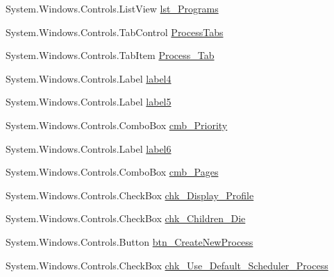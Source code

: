 \begin{DoxyCompactItemize}
\item 
System.\+Windows.\+Controls.\+List\+View \hyperlink{class_c_p_u___o_s___simulator_1_1_operating_system_main_window_a08c9b2131c204ca49f85c7dbc3c0bde2}{lst\+\_\+\+Programs}
\item 
System.\+Windows.\+Controls.\+Tab\+Control \hyperlink{class_c_p_u___o_s___simulator_1_1_operating_system_main_window_a6e2a1da42cb207d3a02c3bc1613be085}{Process\+Tabs}
\item 
System.\+Windows.\+Controls.\+Tab\+Item \hyperlink{class_c_p_u___o_s___simulator_1_1_operating_system_main_window_a01c2d1944c9470e56e5bbbcdff683f2b}{Process\+\_\+\+Tab}
\item 
System.\+Windows.\+Controls.\+Label \hyperlink{class_c_p_u___o_s___simulator_1_1_operating_system_main_window_a11f07634242ba2c38b23b293dcd3843e}{label4}
\item 
System.\+Windows.\+Controls.\+Label \hyperlink{class_c_p_u___o_s___simulator_1_1_operating_system_main_window_a2b7721f6cfb0a1eeb4a0aec34ef543c0}{label5}
\item 
System.\+Windows.\+Controls.\+Combo\+Box \hyperlink{class_c_p_u___o_s___simulator_1_1_operating_system_main_window_a52618598a5f66eb457af669a7ca849d9}{cmb\+\_\+\+Priority}
\item 
System.\+Windows.\+Controls.\+Label \hyperlink{class_c_p_u___o_s___simulator_1_1_operating_system_main_window_ad753667e4d67f79b83e59dc8be4df684}{label6}
\item 
System.\+Windows.\+Controls.\+Combo\+Box \hyperlink{class_c_p_u___o_s___simulator_1_1_operating_system_main_window_ab8bcdf83f7bfdecbdd3f8ba71cc92a5e}{cmb\+\_\+\+Pages}
\item 
System.\+Windows.\+Controls.\+Check\+Box \hyperlink{class_c_p_u___o_s___simulator_1_1_operating_system_main_window_aa13338d96952aafec3ecbc7f4fa6fcfc}{chk\+\_\+\+Display\+\_\+\+Profile}
\item 
System.\+Windows.\+Controls.\+Check\+Box \hyperlink{class_c_p_u___o_s___simulator_1_1_operating_system_main_window_a22ea0e1679c79b12e2637f93543c0bef}{chk\+\_\+\+Children\+\_\+\+Die}
\item 
System.\+Windows.\+Controls.\+Button \hyperlink{class_c_p_u___o_s___simulator_1_1_operating_system_main_window_a30b8c5bcaa36e85ba4b41f23c1bbfdde}{btn\+\_\+\+Create\+New\+Process}
\item 
System.\+Windows.\+Controls.\+Check\+Box \hyperlink{class_c_p_u___o_s___simulator_1_1_operating_system_main_window_a8af478cc94c72b0c843b4911f43aecdf}{chk\+\_\+\+Use\+\_\+\+Default\+\_\+\+Scheduler\+\_\+\+Process}

\end{DoxyCompactItemize}
